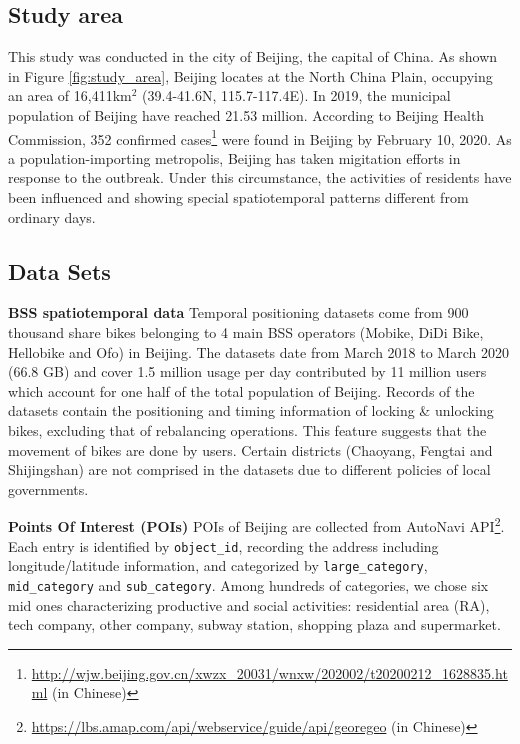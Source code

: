 \documentclass[preprints,ijgi,submit,moreauthors]{Definitions/mdpi}
\begin{document}
\subsection{Study area}
This study was conducted in the city of Beijing, the capital of China.
As shown in Figure \ref{fig:study_area}, Beijing locates at the North China Plain, occupying an area of 16,411km$^2$ (39.4{\degree}-41.6{\degree}N, 115.7{\degree}-117.4{\degree}E).
In 2019, the municipal population of Beijing have reached 21.53 million. According to Beijing Health Commission, 352 confirmed cases\footnote{\url{http://wjw.beijing.gov.cn/xwzx_20031/wnxw/202002/t20200212_1628835.html} (in Chinese)} were found in Beijing by February 10, 2020.
As a population-importing metropolis, Beijing has taken migitation efforts in response to the outbreak. 
Under this circumstance, the activities of residents have been influenced and showing special spatiotemporal patterns different from ordinary days.

\subsection{Data Sets}
\textbf{BSS spatiotemporal data} Temporal positioning datasets come from 900 thousand share bikes belonging to 4 main BSS operators (Mobike, DiDi Bike, Hellobike and Ofo) in Beijing.
The datasets date from March 2018 to March 2020 (66.8 GB) and cover 1.5 million usage per day contributed by 11 million users which account for one half of the total population of Beijing.
Records of the datasets contain the positioning and timing information of locking \& unlocking bikes, excluding that of rebalancing operations.
This feature suggests that the movement of bikes are done by users.
Certain districts (Chaoyang, Fengtai and Shijingshan) are not comprised in the datasets due to different policies of local governments.

\textbf{Points Of Interest (POIs)} POIs of Beijing are collected from AutoNavi API\footnote{\url{https://lbs.amap.com/api/webservice/guide/api/georegeo} (in Chinese)}.
Each entry is identified by \texttt{object\_id}, recording the address including longitude/latitude information, and categorized by \texttt{large\_category}, \texttt{mid\_category} and \texttt{sub\_category}.
Among hundreds of categories, we chose six mid ones characterizing productive and social activities: residential area (RA), tech company, other company, subway station, shopping plaza and supermarket.
\end{document}
